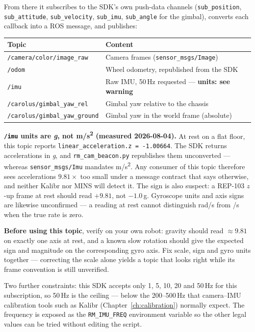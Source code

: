 \documentclass[11pt]{report}
\newenvironment{warningbox}%
  {\begin{lrbox}{\warnbox}\begin{minipage}{0.90\textwidth}}%
  {\end{minipage}\end{lrbox}%
   \begin{center}\fcolorbox{black}{codebg}{\usebox{\warnbox}}\end{center}}
\begin{document}
From there it subscribes to the SDK's own push-data channels
(\texttt{sub\_position}, \texttt{sub\_attitude}, \texttt{sub\_velocity},
\texttt{sub\_imu}, \texttt{sub\_angle} for the gimbal), converts each
callback into a ROS message, and publishes:

\begin{center}
\begin{tabular}{ll}
\toprule
Topic & Content \\
\midrule
\texttt{/camera/color/image\_raw} & Camera frames (\texttt{sensor\_msgs/Image}) \\
\texttt{/odom} & Wheel odometry, republished from the SDK \\
\texttt{/imu} & Raw IMU, 50\,Hz requested --- \textbf{units: see warning} \\
\texttt{/carolus/gimbal\_yaw\_rel} & Gimbal yaw relative to the chassis \\
\texttt{/carolus/gimbal\_yaw\_ground} & Gimbal yaw in the world frame (absolute) \\
\bottomrule
\end{tabular}
\end{center}

\begin{warningbox}
\textbf{\texttt{/imu} units are \emph{g}, not m/s\textsuperscript{2}
(measured 2026-08-04).} At rest on a flat floor, this topic reports
\texttt{linear\_acceleration.z = -1.00664}. The SDK returns accelerations in
\emph{g}, and \texttt{rm\_cam\_beacon.py} republishes them unconverted ---
whereas \texttt{sensor\_msgs/Imu} mandates
m/s\textsuperscript{2}. Any consumer of this topic therefore sees
accelerations $9.81\times$ too small under a message contract that says
otherwise, and neither Kalibr nor MINS will detect it. The sign is also
suspect: a REP-103 $z$-up frame at rest should read $+9.81$, not $-1.0$\,g.
Gyroscope units and axis signs are likewise unconfirmed --- a reading at rest
cannot distinguish rad/s from \textdegree/s when the true rate is zero.

\textbf{Before using this topic}, verify on your own robot: gravity should
read $\approx\!9.81$ on exactly one axis at rest, and a known slow rotation
should give the expected sign and magnitude on the corresponding gyro axis.
Fix scale, sign and gyro units together --- correcting the scale alone yields
a topic that looks right while its frame convention is still unverified.

Two further constraints: this SDK accepts only 1, 5, 10, 20 and 50\,Hz for
this subscription, so 50\,Hz is the ceiling --- below the 200--500\,Hz that
camera--IMU calibration tools such as Kalibr
(Chapter~\ref{ch:calibration}) normally expect. The frequency is exposed as
the \texttt{RM\_IMU\_FREQ} environment variable so the other legal values can
be tried without editing the script.
\end{warningbox}
\end{document}

